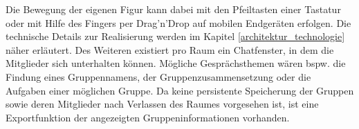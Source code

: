 Die Bewegung der eigenen Figur kann dabei mit den Pfeiltasten einer Tastatur oder mit Hilfe des Fingers per Drag'n'Drop auf mobilen Endgeräten erfolgen. Die technische Details zur Realisierung werden im Kapitel \ref{architektur_technologie} näher erläutert. 
\newline\newline
Des Weiteren existiert pro Raum ein Chatfenster, in dem die Mitglieder sich unterhalten können. Mögliche Gesprächsthemen wären bspw. die Findung eines Gruppennamens, der Gruppenzusammensetzung oder die Aufgaben einer möglichen Gruppe. Da keine persistente Speicherung der Gruppen sowie deren Mitglieder nach Verlassen des Raumes vorgesehen ist, ist eine Exportfunktion der angezeigten Gruppeninformationen vorhanden.

